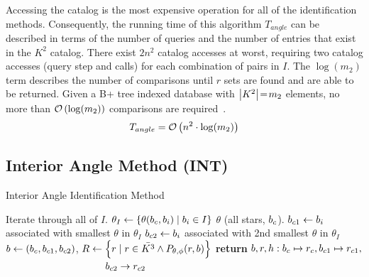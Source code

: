 Accessing the catalog is the most expensive operation for all of the identification methods.
Consequently, the running time of this algorithm $T_{angle}$ can be described in terms of the number of queries and
the number of entries that exist in the $K^2$ catalog.
There exist $2n^2$ catalog accesses at worst, requiring two catalog accesses (query step and  calls) for
each combination of pairs in $I$.
The $\log (m_2)$ term describes the number of comparisons until $r$ sets are found and are able to be returned.
Given a B+ tree indexed database with $\left| K^2 \right| \!=\! m_2$ elements, no more than $\mathcal{O} \left( \log(m_2) \right)$
comparisons are required~\cite{patel:advanceTreeStructures}.
\begin{equation}\label{eq:complexityAngle}
    T_{angle} = \bigO\left( n^2 \cdot \log(m_2) \right)
\end{equation}


\subsection{Interior Angle Method (INT)}\label{subsec:interiorAngleMethod}
\begin{algorithm}
    \caption{Interior Angle Identification Method} \label{algorithm:interiorAngleIdentification}
    \begin{algorithmic}[1]
          \Comment Iterate through all of $I$.
        \State $\theta_I \gets \{\theta(b_c, b_i) \mid b_i \in I\}$ \Comment $\theta$
        (all stars, $b_c$).
        \State $b_{c1} \gets b_i$ associated with smallest $\theta$ in $\theta_I$
        \State $b_{c2} \gets b_i$ associated with 2nd smallest $\theta$ in $\theta_I$
        \State $b \gets \left(b_c, b_{c1}, b_{c2}\right)$, $R \gets \left\{  r \mid r \in \bar{K^3} \land
        P_{\theta, \phi}(r, b)  \right\}$
        \State \textbf{return} $b, r, h: b_c \mapsto r_c, b_{c1} \mapsto r_{c1}, $
        \State \ \ \ \ \ \ \ \ \ \ \ \ \ \ \ \ \ \ \ \  $b_{c2} \rightarrow r_{c2}$
        \EndIf
        \EndFor
        \EndFunction
    \end{algorithmic}
\end{algorithm}

